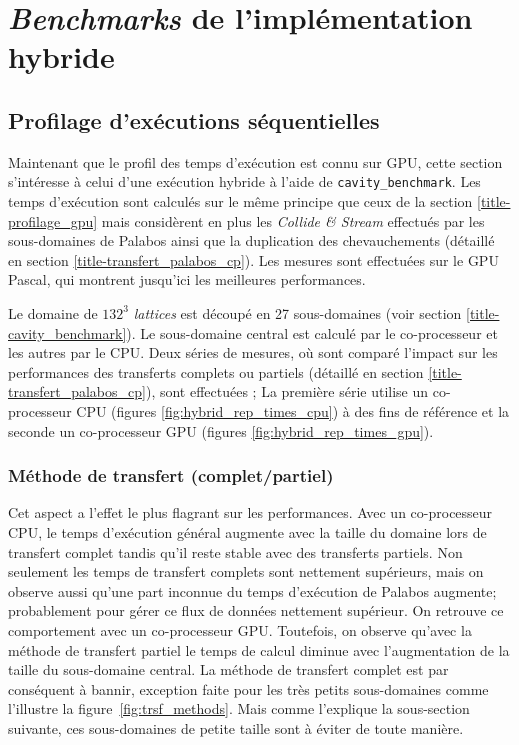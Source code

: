 \section{\textit{Benchmarks} de l'implémentation hybride}

\subsection{Profilage d'exécutions séquentielles}
Maintenant que le profil des temps d'exécution est connu sur \acs{GPU}, cette section s'intéresse à celui d'une exécution hybride à l'aide de \texttt{cavity\_benchmark}. Les temps d'exécution sont calculés sur le même principe que ceux de la section \ref{title-profilage_gpu} mais considèrent en plus les \textit{Collide \& Stream} effectués par les sous-domaines de Palabos ainsi que la duplication des chevauchements (détaillé en section \ref{title-transfert_palabos_cp}). Les mesures sont effectuées sur le \acs{GPU} Pascal, qui montrent jusqu'ici les meilleures performances. 

Le domaine de $132^3$ \textit{lattices} est découpé en 27 sous-domaines (voir section \ref{title-cavity_benchmark}). Le sous-domaine central est calculé par le co-processeur et les autres par le \acs{CPU}. Deux séries de mesures, où sont comparé l'impact sur les performances des transferts complets ou partiels (détaillé en section \ref{title-transfert_palabos_cp}),  sont effectuées ; La première série utilise un co-processeur \acs{CPU} (figures \ref{fig:hybrid_rep_times_cpu}) à des fins de référence et la seconde un co-processeur \acs{GPU} (figures \ref{fig:hybrid_rep_times_gpu}).

\subsubsection{Méthode de transfert (complet/partiel)}
Cet  aspect a l'effet le plus flagrant sur les performances. Avec un co-processeur \acs{CPU}, le temps d'exécution général augmente avec la taille du domaine lors de transfert complet tandis qu'il reste stable avec des transferts partiels. Non seulement les temps de transfert complets sont nettement supérieurs, mais on observe aussi qu'une part inconnue du temps d'exécution de Palabos augmente; probablement pour gérer ce flux de données nettement supérieur. On retrouve ce comportement avec un co-processeur \acs{GPU}. Toutefois, on observe qu’avec la méthode de transfert partiel le temps de calcul diminue avec l’augmentation de la taille du sous-domaine central. La méthode de transfert complet est par conséquent à bannir, exception faite pour les très petits sous-domaines comme l'illustre la figure~\ref{fig:trsf_methods}. Mais comme l’explique la sous-section suivante, ces sous-domaines de petite taille sont à éviter de toute manière.

